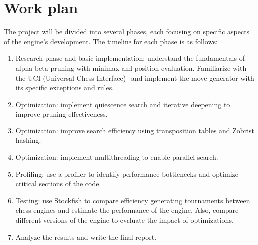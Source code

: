 \section{Work plan}

The project will be divided into several phases, each focusing on specific aspects of the engine's development. The timeline for each phase is as follows:

\begin{enumerate}
    \item Research phase and basic implementation: understand the fundamentals of alpha-beta pruning with minimax and position evaluation. Familiarize with the UCI (Universal Chess Interface)~\cite{UciProtocol} and implement the move generator with its specific exceptions and rules.
    \item Optimization: implement quiescence search and iterative deepening to improve pruning effectiveness.
    \item Optimization: improve search efficiency using transposition tables and Zobrist hashing.
    \item Optimization: implement multithreading to enable parallel search.
    \item Profiling: use a profiler to identify performance bottlenecks and optimize critical sections of the code.
    \item Testing: use Stockfish to compare efficiency generating tournaments between chess engines and estimate the performance of the engine. Also, compare different versions of the engine to evaluate the impact of optimizations.
    \item Analyze the results and write the final report.
\end{enumerate}



